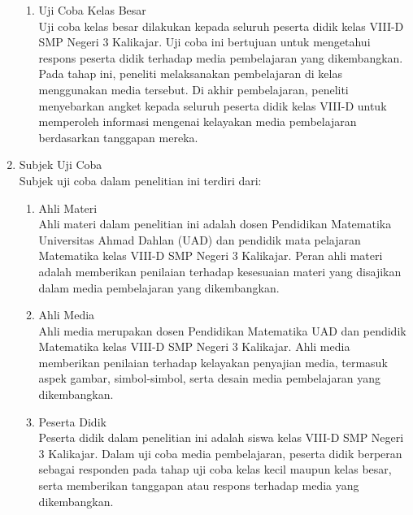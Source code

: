 \documentclass[12pt]{article}
\begin{document}
\begin{enumerate}
\begin{enumerate}
        \item Uji Coba Kelas Besar\\
        \hspace*{1cm}Uji coba kelas besar dilakukan kepada seluruh peserta didik kelas VIII-D SMP Negeri 3 Kalikajar. Uji coba ini bertujuan untuk mengetahui respons peserta didik terhadap media pembelajaran yang dikembangkan. Pada tahap ini, peneliti melaksanakan pembelajaran di kelas menggunakan media tersebut. Di akhir pembelajaran, peneliti menyebarkan angket kepada seluruh peserta didik kelas VIII-D untuk memperoleh informasi mengenai kelayakan media pembelajaran berdasarkan tanggapan mereka.
    \end{enumerate}

    \item Subjek Uji Coba\\
    \hspace*{1cm}Subjek uji coba dalam penelitian ini terdiri dari:
    \begin{enumerate}
        \item Ahli Materi\\
        Ahli materi dalam penelitian ini adalah dosen Pendidikan Matematika Universitas Ahmad Dahlan (UAD) dan pendidik mata pelajaran Matematika kelas VIII-D SMP Negeri 3 Kalikajar. Peran ahli materi adalah memberikan penilaian terhadap kesesuaian materi yang disajikan dalam media pembelajaran yang dikembangkan.

        \item Ahli Media\\
        Ahli media merupakan dosen Pendidikan Matematika UAD dan pendidik Matematika kelas VIII-D SMP Negeri 3 Kalikajar. Ahli media memberikan penilaian terhadap kelayakan penyajian media, termasuk aspek gambar, simbol-simbol, serta desain media pembelajaran yang dikembangkan.

        \item Peserta Didik\\
        Peserta didik dalam penelitian ini adalah siswa kelas VIII-D SMP Negeri 3 Kalikajar. Dalam uji coba media pembelajaran, peserta didik berperan sebagai responden pada tahap uji coba kelas kecil maupun kelas besar, serta memberikan tanggapan atau respons terhadap media yang dikembangkan.
    \end{enumerate}


\end{enumerate}
\end{document}
